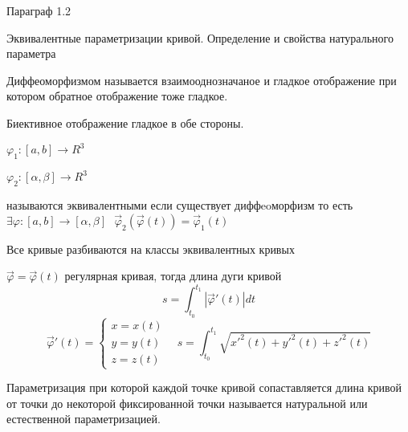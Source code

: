 \begin{title}[\Large]
  Параграф 1.2
\end{title}

\begin{title}[\Large]
  Эквивалентные параметризации кривой. Определение и свойства натурального
  параметра
\end{title}

\begin{define}[диффеоморфизма]
  Диффеоморфизмом называется взаимооднозначаное и гладкое отображение при
  котором обратное отображение тоже гладкое.

  Биективное отображение гладкое в обе стороны.
\end{define}

\begin{define}
  $\varphi_1 : [a,b] \to R^3$

  $\varphi_2 : [\alpha, \beta] \to R^3$

  называются эквивалентными если существует диффeoморфизм то есть
  $\exists \varphi : [a,b] \to [\alpha, \beta] ~~~ \vec \varphi_2
  (\vec \varphi(t)) = \vec \varphi_1(t)$

  Все кривые разбиваются на классы эквивалентных кривых
\end{define}

\begin{block}
  $\vec \varphi = \vec \varphi(t)$ регулярная кривая, тогда длина дуги кривой
  $$
  s = \int_{t_0}^{t_1} | \vec \varphi'(t)| dt
  $$
  $$
  \vec \varphi'(t) =
  \left\{
  \begin{array}{c}
    x = x(t) \\
    y = y(t) \\
    z = z(t)
  \end{array}
  \right. ~~~~
  s = \int_{t_0}^{t_1} \sqrt{ x'^2(t) + y'^2(t) + z'^2(t)}
  $$
\end{block}

\begin{define}
  Параметризация при которой каждой точке кривой сопаставляется длина
  кривой от точки до некоторой фиксированной точки называется натуральной или
  естественной параметризацией.
\end{define}

